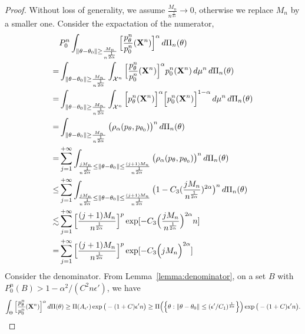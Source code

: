 \documentclass[3p]{elsarticle}
\theoremstyle{plain}
\theoremstyle{definition}
\theoremstyle{remark}
\begin{document}
\begin{proof}
    Without loss of generality, we assume $\frac{M_n}{n^{\frac{1}{2\alpha}}}\to 0$, otherwise we replace $M_n$ by a smaller one.
Consider the expactation of the numerator,
    $$
    \begin{aligned}
        &P_0^n\int_{\|\theta-\theta_0\|\geq \frac{M_n}{n^{\frac{1}{2\alpha}}} } \Big[ \frac{p_{\theta}^n}{p_0^n} (\mathbf{X}^n) \Big]^{\alpha} \, d \Pi_n(\theta)
        \\
        =&
        \int_{\|\theta-\theta_0\|\geq \frac{M_n}{n^{\frac{1}{2\alpha}}} } \int_{\mathcal{X}^n}\Big[ \frac{p^n_{\theta}}{p_0^n} (\mathbf{X}^n) \Big]^{\alpha} p_0^n (\mathbf{X}^n)\, d\mu^n \, d \Pi_n(\theta)\\
        =&
        \int_{\|\theta-\theta_0\|\geq \frac{M_n}{n^{\frac{1}{2\alpha}}} } \int_{\mathcal{X}^n}\Big[ {p^n_{\theta}} (\mathbf{X}^n) \Big]^{\alpha}  \Big[ p_0^n (\mathbf{X}^n) \Big]^{1-\alpha} \, d\mu^n \, d \Pi_n(\theta)\\
        =&
        \int_{\|\theta-\theta_0\|\geq \frac{M_n}{n^{\frac{1}{2\alpha}}} } \big( \rho_{\alpha}(p_{\theta},p_{\theta_0}) \big)^n \, d \Pi_n(\theta)\\
        =&
        \sum_{j=1}^{+\infty} \int_{\frac{j M_n}{n^{\frac{1}{2\alpha}}} \leq \|\theta-\theta_0\|\leq \frac{(j+1)M_n}{n^{\frac{1}{2\alpha}}} } \big( \rho_{\alpha}(p_{\theta},p_{\theta_0}) \big)^n \, d \Pi_n(\theta)
        \\
        \leq&
        \sum_{j=1}^{+\infty} \int_{\frac{j M_n}{n^{\frac{1}{2\alpha}}} \leq \|\theta-\theta_0\|\leq \frac{(j+1)M_n}{n^{\frac{1}{2\alpha}}} } \big( 1- C_3 (\frac{jM_n}{n^{\frac{1}{2\alpha}}})^{2\alpha} \big)^n \, d \Pi_n(\theta)
        \\
        \lesssim&
        \sum_{j=1}^{+\infty}
        \Big[\frac{(j+1)M_n}{n^{\frac{1}{2\alpha}}}\Big]^p
        \exp[- C_3 \Big(\frac{jM_n}{n^{\frac{1}{2\alpha}}}\Big)^{2\alpha}n]
        \\
        =&
        \sum_{j=1}^{+\infty}
        \Big[\frac{(j+1)M_n}{n^{\frac{1}{2\alpha}}}\Big]^p
        \exp[- C_3 \Big({jM_n}\Big)^{2\alpha}]
    \end{aligned}
    $$
    Consider the denominator.
     From Lemma~\ref{lemma:denominator}, on a set $B$ with $P_0^n(B)>1-\alpha^2/(C^2 n \epsilon')$, we have
     $$
     \int_{\Theta}\Big[\frac{p_{\theta}^n}{p_0^n}(\mathbf{X}^n)\Big]^{\alpha} \, d\Pi(\theta)
     \geq \Pi(A_{\epsilon'}) \exp \big(-(1+C)\epsilon' n\big)
     \geq \Pi\Big(\Big\{\theta: \|\theta-\theta_0\|\leq (\epsilon'/C_1)^{\frac{1}{2\alpha}}\Big\}\Big) \exp \big(-(1+C)\epsilon' n\big).
$$
\end{proof}
\end{document}
